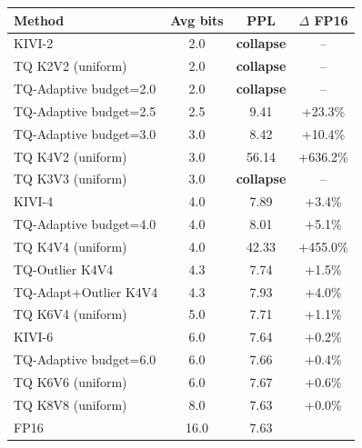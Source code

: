 \begin{tabular}{l c c c}
\toprule
Method & Avg bits & PPL & $\Delta$ FP16 \\
\midrule
KIVI-2 & 2.0 & \textbf{collapse} & -- \\
TQ K2V2 (uniform) & 2.0 & \textbf{collapse} & -- \\
TQ-Adaptive budget=2.0 & 2.0 & \textbf{collapse} & -- \\
TQ-Adaptive budget=2.5 & 2.5 & 9.41 & +23.3\% \\
TQ-Adaptive budget=3.0 & 3.0 & 8.42 & +10.4\% \\
TQ K4V2 (uniform) & 3.0 & 56.14 & +636.2\% \\
TQ K3V3 (uniform) & 3.0 & \textbf{collapse} & -- \\
KIVI-4 & 4.0 & 7.89 & +3.4\% \\
TQ-Adaptive budget=4.0 & 4.0 & 8.01 & +5.1\% \\
TQ K4V4 (uniform) & 4.0 & 42.33 & +455.0\% \\
TQ-Outlier K4V4 & 4.3 & 7.74 & +1.5\% \\
TQ-Adapt+Outlier K4V4 & 4.3 & 7.93 & +4.0\% \\
TQ K6V4 (uniform) & 5.0 & 7.71 & +1.1\% \\
KIVI-6 & 6.0 & 7.64 & +0.2\% \\
TQ-Adaptive budget=6.0 & 6.0 & 7.66 & +0.4\% \\
TQ K6V6 (uniform) & 6.0 & 7.67 & +0.6\% \\
TQ K8V8 (uniform) & 8.0 & 7.63 & +0.0\% \\
FP16 & 16.0 & 7.63 &  \\
\bottomrule
\end{tabular}